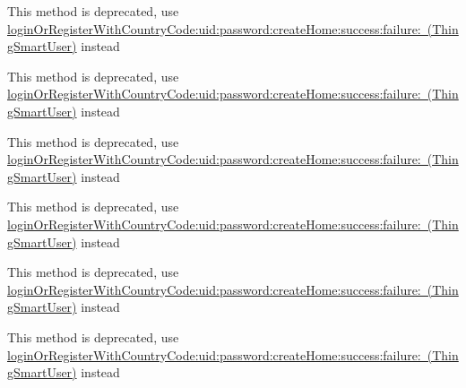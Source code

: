 \begin{DoxyRefList}
\label{deprecated__deprecated000206}%
%
This method is deprecated, use \mbox{\hyperlink{interface_thing_smart_user_a2e848d4067bc3e9aed5a7db187ceecd6}{login\+Or\+Register\+With\+Country\+Code\+:uid\+:password\+:create\+Home\+:success\+:failure\+: (\+Thing\+Smart\+User)}} instead 

\label{deprecated__deprecated000216}%
%
This method is deprecated, use \mbox{\hyperlink{interface_thing_smart_user_a2e848d4067bc3e9aed5a7db187ceecd6}{login\+Or\+Register\+With\+Country\+Code\+:uid\+:password\+:create\+Home\+:success\+:failure\+: (\+Thing\+Smart\+User)}} instead 

\label{deprecated__deprecated000236}%
%
This method is deprecated, use \mbox{\hyperlink{interface_thing_smart_user_a2e848d4067bc3e9aed5a7db187ceecd6}{login\+Or\+Register\+With\+Country\+Code\+:uid\+:password\+:create\+Home\+:success\+:failure\+: (\+Thing\+Smart\+User)}} instead  
\item[(Deprecated\+Api) Member \mbox{\hyperlink{category_thing_smart_user_07_deprecated_api_08_ac74a92f8a3877c0ea6eb85ecf76da278}{\mbox{[}Thing\+Smart\+User(Deprecated\+Api) login\+Or\+Register\+By\+Phone\+:uid\+:password\+:create\+Home\+:success\+:failure\+:\mbox{]}}} ]\label{deprecated__deprecated000204}%
%
This method is deprecated, use \mbox{\hyperlink{interface_thing_smart_user_a2e848d4067bc3e9aed5a7db187ceecd6}{login\+Or\+Register\+With\+Country\+Code\+:uid\+:password\+:create\+Home\+:success\+:failure\+: (\+Thing\+Smart\+User)}} instead 

\label{deprecated__deprecated000234}%
%
This method is deprecated, use \mbox{\hyperlink{interface_thing_smart_user_a2e848d4067bc3e9aed5a7db187ceecd6}{login\+Or\+Register\+With\+Country\+Code\+:uid\+:password\+:create\+Home\+:success\+:failure\+: (\+Thing\+Smart\+User)}} instead 

\label{deprecated__deprecated000224}%
%
This method is deprecated, use \mbox{\hyperlink{interface_thing_smart_user_a2e848d4067bc3e9aed5a7db187ceecd6}{login\+Or\+Register\+With\+Country\+Code\+:uid\+:password\+:create\+Home\+:success\+:failure\+: (\+Thing\+Smart\+User)}} instead 


\end{DoxyRefList}
